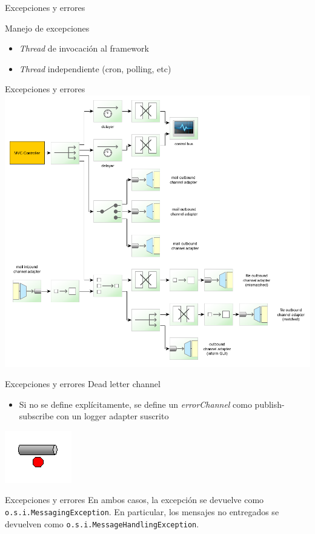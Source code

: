 \documentclass{beamer}
\begin{document}
\begin{frame}{Excepciones y errores}
\begin{center}
{\large Manejo de excepciones}
\end{center}
\begin{itemize}
\item \textit{Thread} de invocación al framework
\item \textit{Thread} independiente (cron, polling, etc)
\end{itemize}
\end{frame}

\begin{frame}{Excepciones y errores}
\includegraphics[width=0.7\linewidth]{sp-int-99}
\end{frame}

\begin{frame}{Excepciones y errores}
{\large Dead letter channel}
\begin{itemize}
\item Si no se define explícitamente, se define un \textit{errorChannel} como publish-subscribe con un logger adapter suscrito
\end{itemize}
\begin{center}
\includegraphics[width=0.2\linewidth]{sp-int-21}
\end{center}
\end{frame}

\begin{frame}[fragile]{Excepciones y errores}
En ambos casos, la excepción se devuelve como \verb|o.s.i.MessagingException|. En particular, los mensajes no entregados se devuelven como \verb|o.s.i.MessageHandlingException|.
\end{frame}
\end{document}
